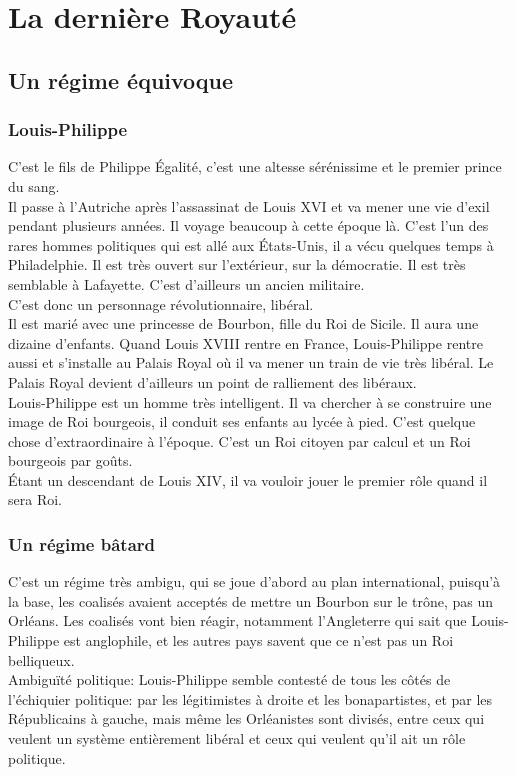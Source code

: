 \documentclass[10pt, a4paper, openany]{book}
\begin{document}
\section{La dernière Royauté}

\subsection{Un régime équivoque}

\subsubsection{Louis-Philippe}

C'est le fils de Philippe Égalité, c'est une altesse sérénissime et le premier prince du sang. \\
Il passe à l'Autriche après l'assassinat de Louis XVI et va mener une vie d'exil pendant plusieurs années. Il voyage beaucoup à cette époque là. C'est l'un des rares hommes politiques qui est allé aux États-Unis, il a vécu quelques temps à Philadelphie. Il est très ouvert sur l'extérieur, sur la démocratie. Il est très semblable à Lafayette. C'est d'ailleurs un ancien militaire. \\
C'est donc un personnage révolutionnaire, libéral. \\
Il est marié avec une princesse de Bourbon, fille du Roi de Sicile. Il aura une dizaine d'enfants. Quand Louis XVIII rentre en France, Louis-Philippe rentre aussi et s'installe au Palais Royal où il va mener un train de vie très libéral. Le Palais Royal devient d'ailleurs un point de ralliement des libéraux. \\
Louis-Philippe est un homme très intelligent. Il va chercher à se construire une image de Roi bourgeois, il conduit ses enfants au lycée à pied. C'est quelque chose d'extraordinaire à l'époque. C'est un Roi citoyen par calcul et un Roi bourgeois par goûts. \\
Étant un descendant de Louis XIV, il va vouloir jouer le premier rôle quand il sera Roi. 

\subsubsection{Un régime bâtard}

C'est un régime très ambigu, qui se joue d'abord au plan international, puisqu'à la base, les coalisés avaient acceptés de mettre un Bourbon sur le trône, pas un Orléans. Les coalisés vont bien réagir, notamment l'Angleterre qui sait que Louis-Philippe est anglophile, et les autres pays savent que ce n'est pas un Roi belliqueux. \\
Ambiguïté politique: Louis-Philippe semble contesté de tous les côtés de l'échiquier politique: par les légitimistes à droite et les bonapartistes, et par les Républicains à gauche, mais même les Orléanistes sont divisés, entre ceux qui veulent un système entièrement libéral et ceux qui veulent qu'il ait un rôle politique.
\end{document}
